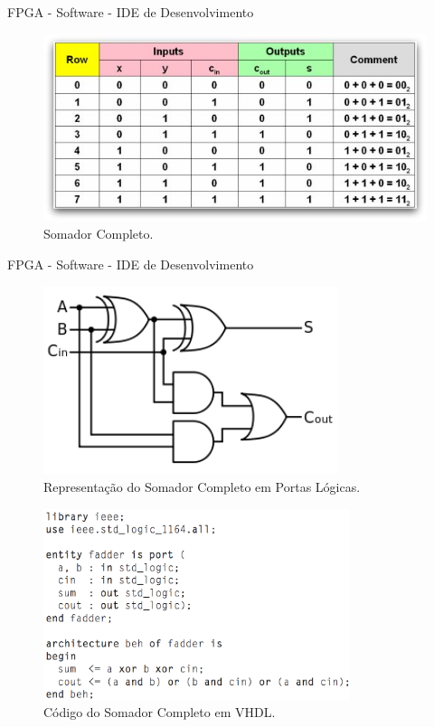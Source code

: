 	\begin{frame}{FPGA - Software - IDE de Desenvolvimento}
		\begin{figure}[p]
			\centering
			\includegraphics[width=1\textwidth]{img/fpga/adder-table.jpg}
			\caption{Somador Completo.}
			\label{fig:somador_completo}
		\end{figure}
	\end{frame}

	\begin{frame}{FPGA - Software - IDE de Desenvolvimento}
		\begin{figure}[p]
			\centering
			\includegraphics[width=0.77\textwidth]{img/fpga/adder.png}
			\caption{Representação do Somador Completo em Portas Lógicas.}
			\label{fig:somador_completo_pl}
		\end{figure}
	\end{frame}

	\begin{frame}%
		\begin{figure}[p]
			\centering
			\includegraphics[width=0.8\textwidth]{img/fpga/code_vhdl.png}
			\caption{Código do Somador Completo em VHDL.}
			\label{fig:codigo_vhdl}
		\end{figure}
	\end{frame}


